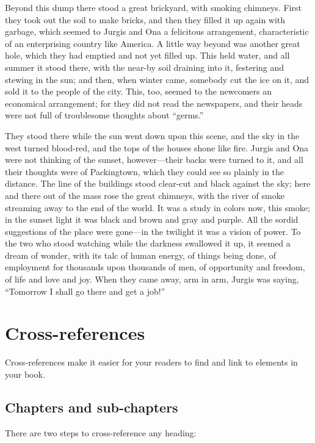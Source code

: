 \documentclass[
]{book}
\theoremstyle{definition}
\theoremstyle{definition}
\theoremstyle{definition}
\theoremstyle{definition}
\theoremstyle{remark}
\begin{document}
Beyond this dump there stood a great brickyard, with smoking chimneys. First they took out the soil to make bricks, and then they filled it up again with garbage, which seemed to Jurgis and Ona a felicitous arrangement, characteristic of an enterprising country like America. A little way beyond was another great hole, which they had emptied and not yet filled up. This held water, and all summer it stood there, with the near-by soil draining into it, festering and stewing in the sun; and then, when winter came, somebody cut the ice on it, and sold it to the people of the city. This, too, seemed to the newcomers an economical arrangement; for they did not read the newspapers, and their heads were not full of troublesome thoughts about ``germs.''

They stood there while the sun went down upon this scene, and the sky in the west turned blood-red, and the tops of the houses shone like fire. Jurgis and Ona were not thinking of the sunset, however---their backs were turned to it, and all their thoughts were of Packingtown, which they could see so plainly in the distance. The line of the buildings stood clear-cut and black against the sky; here and there out of the mass rose the great chimneys, with the river of smoke streaming away to the end of the world. It was a study in colors now, this smoke; in the sunset light it was black and brown and gray and purple. All the sordid suggestions of the place were gone---in the twilight it was a vision of power. To the two who stood watching while the darkness swallowed it up, it seemed a dream of wonder, with its talc of human energy, of things being done, of employment for thousands upon thousands of men, of opportunity and freedom, of life and love and joy. When they came away, arm in arm, Jurgis was saying, ``Tomorrow I shall go there and get a job!''

\chapter{Cross-references}\label{cross}

Cross-references make it easier for your readers to find and link to elements in your book.

\section{Chapters and sub-chapters}\label{chapters-and-sub-chapters}

There are two steps to cross-reference any heading:
\end{document}
